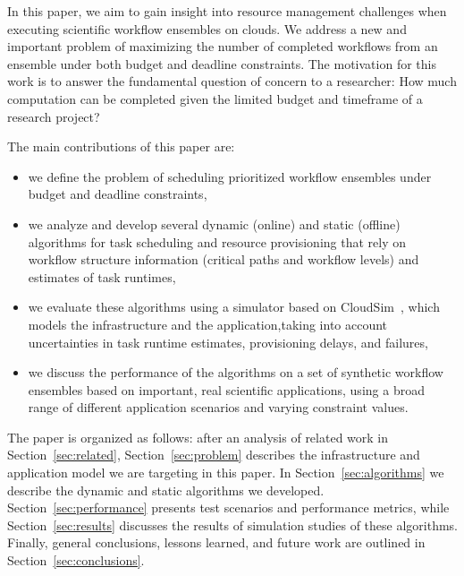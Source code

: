 \documentclass[conference]{IEEEtran}
\begin{document}
In this paper, we aim to gain insight into resource management challenges when
executing scientific workflow ensembles on clouds. We address a
new and important problem of maximizing the number of completed workflows from
an ensemble under both budget and deadline constraints. The motivation for this
work is to answer the fundamental question of concern to a researcher: How much
computation can be completed given the limited budget and timeframe of a
research project? 

The main contributions of this paper are:
\begin{itemize}
  \item we define the problem of scheduling prioritized workflow ensembles
  under budget and deadline constraints,
  \item we analyze and develop several dynamic (online) and static (offline) 
  algorithms for task scheduling and resource provisioning that rely on workflow 
  structure information (critical paths and workflow levels) and estimates of 
  task runtimes,
  \item we evaluate these algorithms using a simulator based on 
  CloudSim~\cite{Calheiros2011}, which models the infrastructure and the 
  application,taking into account uncertainties in task runtime estimates, 
  provisioning delays, and failures, 
  \item we discuss the performance of the algorithms on a set of
  synthetic workflow ensembles based on important, real scientific
  applications, using a broad range of different application scenarios and
  varying constraint values.
\end{itemize}

The paper is organized as follows: after an analysis of related work in
Section~\ref{sec:related}, Section~\ref{sec:problem} describes the
infrastructure and application model we are targeting in this paper. In
Section~\ref{sec:algorithms} we describe the dynamic and static algorithms we
developed. Section~\ref{sec:performance} presents test scenarios and performance
metrics, while Section~\ref{sec:results} discusses the results of simulation
studies of these algorithms. Finally, general conclusions, lessons learned, and
future work are outlined in Section~\ref{sec:conclusions}.
\end{document}
